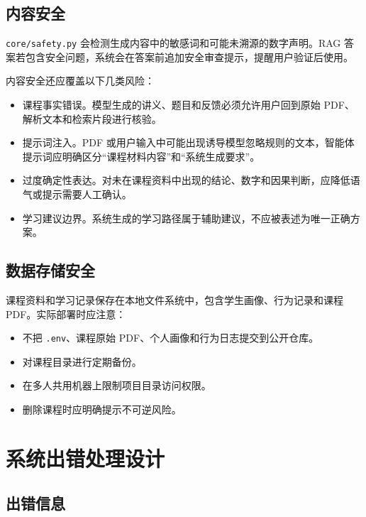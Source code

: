 \documentclass[UTF8,fontset=windows,zihao=-4,openany]{ctexrep}
\begin{document}
\section{内容安全}

\texttt{core/safety.py} 会检测生成内容中的敏感词和可能未溯源的数字声明。RAG 答案若包含安全问题，系统会在答案前追加安全审查提示，提醒用户验证后使用。

内容安全还应覆盖以下几类风险：
\begin{itemize}
  \item 课程事实错误。模型生成的讲义、题目和反馈必须允许用户回到原始 PDF、解析文本和检索片段进行核验。
  \item 提示词注入。PDF 或用户输入中可能出现诱导模型忽略规则的文本，智能体提示词应明确区分“课程材料内容”和“系统生成要求”。
  \item 过度确定性表达。对未在课程资料中出现的结论、数字和因果判断，应降低语气或提示需要人工确认。
  \item 学习建议边界。系统生成的学习路径属于辅助建议，不应被表述为唯一正确方案。
\end{itemize}

\section{数据存储安全}

课程资料和学习记录保存在本地文件系统中，包含学生画像、行为记录和课程 PDF。实际部署时应注意：
\begin{itemize}
  \item 不把 \texttt{.env}、课程原始 PDF、个人画像和行为日志提交到公开仓库。
  \item 对课程目录进行定期备份。
  \item 在多人共用机器上限制项目目录访问权限。
  \item 删除课程时应明确提示不可逆风险。
\end{itemize}

\chapter{系统出错处理设计}

\section{出错信息}
\end{document}
